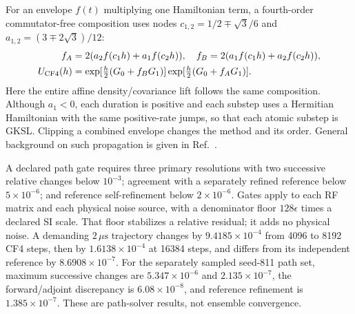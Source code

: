 \documentclass[11pt,a4paper]{article}
\begin{document}
For an envelope $f(t)$ multiplying one Hamiltonian term, a fourth-order
commutator-free composition uses nodes $c_{1,2}=1/2\mp\sqrt3/6$ and
$a_{1,2}=(3\mp2\sqrt3)/12$:
\begin{align}
 f_A&=2(a_2f(c_1h)+a_1f(c_2h)),\quad
 f_B=2(a_1f(c_1h)+a_2f(c_2h)),\nonumber\\
 U_{\rm CF4}(h)&=\exp[\tfrac h2(G_0+f_BG_1)]
                 \exp[\tfrac h2(G_0+f_AG_1)].
 \label{eq:gc-cf4}
\end{align}
Here the entire affine density/covariance lift follows the same composition.
Although $a_1<0$, each duration is positive and each substep uses a Hermitian
Hamiltonian with the same positive-rate jumps, so that each atomic substep is
GKSL. Clipping a combined envelope changes the method and its order.
General background on such propagation is given in
Ref.~\cite{Alvermann2012}.

A declared path gate requires three primary resolutions with two successive
relative changes below $10^{-3}$; agreement with a separately refined
reference below $5\times10^{-6}$; and reference self-refinement below
$2\times10^{-6}$. Gates apply to each RF matrix and each physical noise
source, with a denominator floor $128\epsilon$ times a declared SI scale.
That floor stabilizes a relative residual; it adds no physical noise.
A demanding $2\,\mu\mathrm s$ trajectory changes by $9.4185\times10^{-4}$
from 4096 to 8192 CF4 steps, then by $1.6138\times10^{-4}$ at 16384 steps,
and differs from its independent reference by $8.6908\times10^{-7}$.
For the separately sampled seed-811 path set, maximum successive changes are
$5.347\times10^{-6}$ and $2.135\times10^{-7}$, the forward/adjoint
discrepancy is $6.08\times10^{-8}$, and reference refinement is
$1.385\times10^{-7}$. These are path-solver results, not ensemble convergence.
\end{document}
